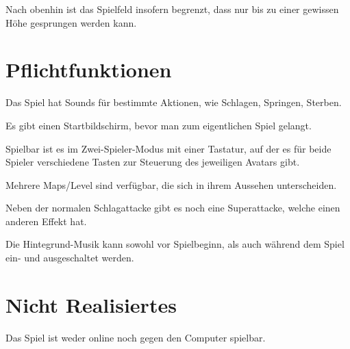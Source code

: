 \documentclass[11pt]{article}
\newcommand{\paragraphspace}{0.3cm}
\begin{document}
    \noindent
    Nach obenhin ist das Spielfeld insofern begrenzt, dass nur bis zu einer gewissen H\"ohe gesprungen werden kann.

    \section{Pflichtfunktionen}\label{sec:muss}
    Das Spiel hat Sounds f\"ur bestimmte Aktionen, wie Schlagen, Springen, Sterben.
    \vspace{\paragraphspace}

    \noindent
    Es gibt einen Startbildschirm, bevor man zum eigentlichen Spiel gelangt.
    \vspace{\paragraphspace}

    \noindent
    Spielbar ist es im \glqq Zwei-Spieler-Modus\grqq{} mit einer Tastatur, auf der es f\"ur beide Spieler verschiedene
    Tasten zur Steuerung des jeweiligen Avatars gibt.
    \vspace{\paragraphspace}

    \noindent
    Mehrere Maps/Level sind verf\"ugbar, die sich in ihrem Aussehen unterscheiden.
    \vspace{\paragraphspace}

    \noindent
    Neben der normalen Schlagattacke gibt es noch eine Superattacke, welche einen anderen Effekt hat.
    \vspace{\paragraphspace}

    \noindent
    Die Hintegrund-Musik kann sowohl vor Spielbeginn, als auch w\"ahrend dem Spiel ein- und ausgeschaltet werden.

    \section{Nicht Realisiertes}\label{sec:kann-nicht}

    Das Spiel ist weder online noch gegen den Computer spielbar.
    \vspace{\paragraphspace}
\end{document}
